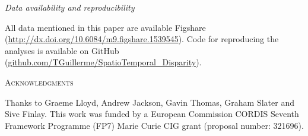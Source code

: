 \documentclass[12pt,letterpaper]{article}
\renewcommand{\section}[1]{%
\bigskip
\begin{center}
\begin{Large}
\normalfont\scshape #1
\medskip
\end{Large}
\end{center}}
\renewcommand{\subsection}[1]{%
\bigskip
\begin{center}
\begin{large}
\normalfont\itshape #1
\end{large}
\end{center}}
\begin{document}
\subsection{Data availability and reproducibility}
All data mentioned in this paper are available Figshare (\url{http://dx.doi.org/10.6084/m9.figshare.1539545}).
Code for reproducing the analyses is available on GitHub (\url{github.com/TGuillerme/SpatioTemporal_Disparity}).

\section{Acknowledgments}
Thanks to Graeme Lloyd, Andrew Jackson, Gavin Thomas, Graham Slater and Sive Finlay.
This work was funded by a European Commission CORDIS Seventh Framework Programme (FP7) Marie Curie CIG grant (proposal number: 321696).
\end{document}
